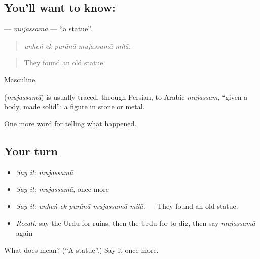 \subsection*{You'll want to know: }
\textbf{} — \emph{mujassamā} — \textquotedblleft{}a statue\textquotedblright{}.

\begin{quote}
    
\end{quote}

\begin{quote}
\emph{unheṅ ek purānā mujassamā milā.}
\end{quote}

\begin{quote}
They found an old statue.
\end{quote}

Masculine.

\begin{cousinweb}
\textbf{} (\emph{mujassamā}) is usually traced, through Persian, to Arabic \emph{mujassam}, \textquotedblleft{}given a body, made solid\textquotedblright{}: a figure in stone or metal.
\end{cousinweb}

\begin{grammarlens}[title={What you've built}]
One more word for telling what happened.
\end{grammarlens}

\subsection*{Your turn}
\begin{itemize}
\raggedright
  \item \emph{Say it:} \emph{mujassamā}
  \item \emph{Say it:} \emph{mujassamā}, once more
  \item \emph{Say it:} \emph{unheṅ ek purānā mujassamā milā.} — They found an old statue.
  \item \emph{Recall:} say the Urdu for ruins, then the Urdu for to dig, then say \emph{mujassamā} again
\end{itemize}

\begin{tcolorbox}[breakable,colback=teal!4,colframe=teal!35!black,title={Before you move on}]
What does  mean? (\textquotedblleft{}A statue\textquotedblright{}.) Say it once more.
\end{tcolorbox}
